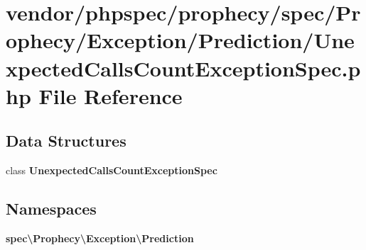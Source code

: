 \section{vendor/phpspec/prophecy/spec/\+Prophecy/\+Exception/\+Prediction/\+Unexpected\+Calls\+Count\+Exception\+Spec.php File Reference}
\label{_unexpected_calls_count_exception_spec_8php}
\subsection*{Data Structures}
\begin{DoxyCompactItemize}
\item 
class {\bf Unexpected\+Calls\+Count\+Exception\+Spec}
\end{DoxyCompactItemize}
\subsection*{Namespaces}
\begin{DoxyCompactItemize}
\item 
 {\bf spec\textbackslash{}\+Prophecy\textbackslash{}\+Exception\textbackslash{}\+Prediction}
\end{DoxyCompactItemize}
